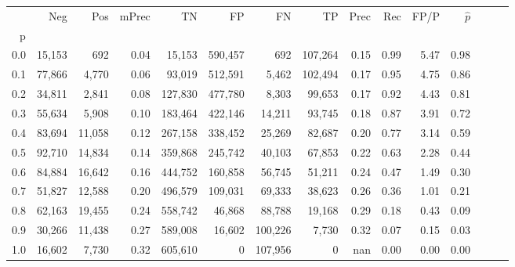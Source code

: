 \begin{tabular}{rrrrrrrrrrrrrrr}
\toprule
{} &     Neg &     Pos & mPrec &       TN &       FP &       FN &       TP &  Prec &   Rec &  FP/P & $\hat{p}$ \\
p   &         &         &       &          &          &          &          &       &       &       &           \\
\midrule
0.0 &  15,153 &     692 &  0.04 &   15,153 &  590,457 &      692 &  107,264 &  0.15 &  0.99 &  5.47 &      0.98 \\
0.1 &  77,866 &   4,770 &  0.06 &   93,019 &  512,591 &    5,462 &  102,494 &  0.17 &  0.95 &  4.75 &      0.86 \\
0.2 &  34,811 &   2,841 &  0.08 &  127,830 &  477,780 &    8,303 &   99,653 &  0.17 &  0.92 &  4.43 &      0.81 \\
0.3 &  55,634 &   5,908 &  0.10 &  183,464 &  422,146 &   14,211 &   93,745 &  0.18 &  0.87 &  3.91 &      0.72 \\
0.4 &  83,694 &  11,058 &  0.12 &  267,158 &  338,452 &   25,269 &   82,687 &  0.20 &  0.77 &  3.14 &      0.59 \\
0.5 &  92,710 &  14,834 &  0.14 &  359,868 &  245,742 &   40,103 &   67,853 &  0.22 &  0.63 &  2.28 &      0.44 \\
0.6 &  84,884 &  16,642 &  0.16 &  444,752 &  160,858 &   56,745 &   51,211 &  0.24 &  0.47 &  1.49 &      0.30 \\
0.7 &  51,827 &  12,588 &  0.20 &  496,579 &  109,031 &   69,333 &   38,623 &  0.26 &  0.36 &  1.01 &      0.21 \\
0.8 &  62,163 &  19,455 &  0.24 &  558,742 &   46,868 &   88,788 &   19,168 &  0.29 &  0.18 &  0.43 &      0.09 \\
0.9 &  30,266 &  11,438 &  0.27 &  589,008 &   16,602 &  100,226 &    7,730 &  0.32 &  0.07 &  0.15 &      0.03 \\
1.0 &  16,602 &   7,730 &  0.32 &  605,610 &        0 &  107,956 &        0 &   nan &  0.00 &  0.00 &      0.00 \\
\bottomrule
\end{tabular}
